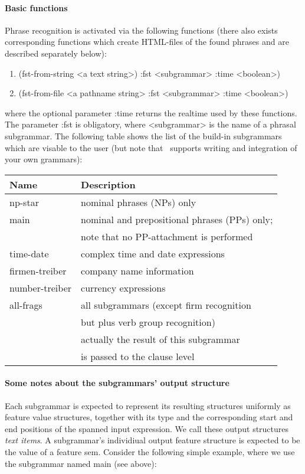 \paragraph{Basic functions}

Phrase recognition is activated via the following functions
(there also exists corresponding functions which create HTML-files of
the found phrases and are described separately below):
\begin{enumerate}

\item   {\sc (fst-from-string <a text string>)  :fst <subgrammar> :time <boolean>)}
\item   {\sc (fst-from-file <a pathname string> :fst <subgrammar> :time <boolean>)}

\end{enumerate}
where the optional parameter {\sc :time} returns the realtime used by 
these functions. The parameter  {\sc :fst} is obligatory, where
{\sc <subgrammar>} is the name of a phrasal
subgrammar. The following table shows the list of the build-in
subgrammars which are visable to the user (but note that \smes\
supports writing and integration of your own grammars):
\vspace{1cm}

\begin{tabular}{||l|l||}\hline
{\bf Name} & {\bf Description}\\\hline
{\sc np-star}   & nominal phrases (NPs) only \\\hline
{\sc main}      & nominal and prepositional phrases (PPs) only;\\%
& note that no PP-attachment is performed\\\hline
{\sc time-date} & complex time and date expressions\\\hline
{\sc firmen-treiber} & company name information \\\hline
{\sc number-treiber} & currency expressions\\\hline
{\sc all-frags}      & all subgrammars (except firm recognition \\
& but plus verb group recognition)\\
& actually the result of this subgrammar \\
& is passed to the clause level\\\hline
  
\end{tabular}

\paragraph{Some notes about the subgrammars' output structure}
Each subgrammar is expected to represent its resulting structures uniformly
as feature value structures, together with its type and
the corresponding
start and end positions of the spanned input expression.
We call these output structures {\em text items}. 
A subgrammar's individiual output feature structure is expected to be
the value of a feature {\sc sem}. Consider the following  simple
example, where we use the subgrammar named {\sc main} (see above):

